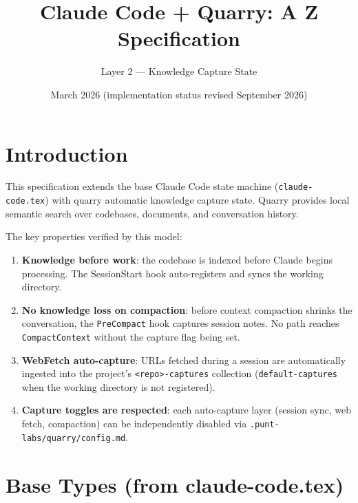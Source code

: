 \documentclass[a4paper,10pt,fleqn]{article}
\begin{document}
\title{Claude Code + Quarry: A Z Specification}
\author{Layer 2 --- Knowledge Capture State}
\date{March 2026 (implementation status revised September 2026)}
\maketitle

\tableofcontents
\newpage

\section{Introduction}

This specification extends the base Claude Code state machine
(\texttt{claude-code.tex}) with quarry automatic knowledge capture
state. Quarry provides local semantic search over codebases,
documents, and conversation history.

The key properties verified by this model:

\begin{enumerate}
  \item \textbf{Knowledge before work}: the codebase is
    indexed before Claude begins processing.  The
    SessionStart hook auto-registers and syncs the working
    directory.
  \item \textbf{No knowledge loss on compaction}: before context
    compaction shrinks the conversation, the \texttt{PreCompact} hook
    captures session notes. No path reaches \texttt{CompactContext}
    without the capture flag being set.
  \item \textbf{WebFetch auto-capture}: URLs fetched during a session
    are automatically ingested into the project's
    \texttt{<repo>-captures} collection (\texttt{default-captures} when
    the working directory is not registered).
  \item \textbf{Capture toggles are respected}: each auto-capture
    layer (session sync, web fetch, compaction) can be independently
    disabled via \texttt{.punt-labs/quarry/config.md}.
\end{enumerate}

\section{Base Types (from claude-code.tex)}
\end{document}

